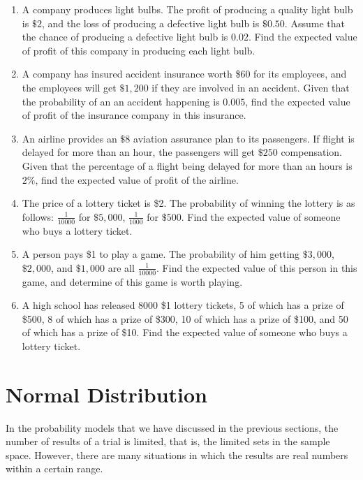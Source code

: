\documentclass{report}
\begin{document}
\begin{multicols}{2}
\begin{enumerate}
    \item A company produces light bulbs. The profit of producing a quality light bulb is
          $\$2$, and the loss of producing a defective light bulb is $\$0.50$. Assume
          that the chance of producing a defective light bulb is $0.02$. Find the
          expected value of profit of this company in producing each light bulb.

    \item A company has insured accident insurance worth \$60 for its employees, and the
          employees will get $\$1,200$ if they are involved in an accident. Given that
          the probability of an an accident happening is $0.005$, find the expected value
          of profit of the insurance company in this insurance.

    \item An airline provides an $\$8$ aviation assurance plan to its passengers. If
          flight is delayed for more than an hour, the passengers will get $\$250$
          compensation. Given that the percentage of a flight being delayed for more than
          an hours is $2\%$, find the expected value of profit of the airline.

    \item The price of a lottery ticket is \$2. The probability of winning the lottery is
          as follows: $\frac{1}{10000}$ for $\$5,000$, $\frac{1}{1000}$ for $\$500$. Find
          the expected value of someone who buys a lottery ticket.

    \item A person pays \$1 to play a game. The probability of him getting $\$3,000$,
          $\$2,000$, and $\$1,000$ are all $\frac{1}{10000}$. Find the expected value of
          this person in this game, and determine of this game is worth playing.

    \item A high school has released 8000 \$1 lottery tickets, 5 of which has a prize of
          \$500, 8 of which has a prize of \$300, 10 of which has a prize of \$100, and
          50 of which has a prize of \$10. Find the expected value of someone who buys a
          lottery ticket.
  \end{enumerate}

  \section{Normal Distribution}

  In the probability models that we have discussed in the previous sections, the
  number of results of a trial is limited, that is, the limited sets in the
  sample space. However, there are many situations in which the results are real
  numbers within a certain range.


\end{multicols}
\end{document}
